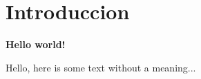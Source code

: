 \documentclass[../main.tex]{subfiles}
\begin{document}
\section{Introduccion}

\textbf{Hello world!}

Hello, here is some text without a meaning...
\end{document}
